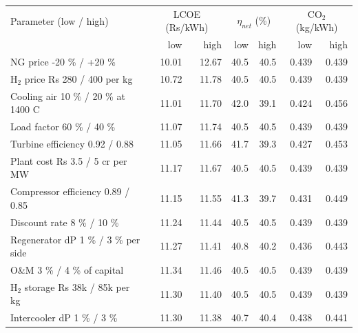\begin{tabular}{lrrrrrr}\toprule Parameter (low / high) & \multicolumn{2}{c}{LCOE (Rs/kWh)} & \multicolumn{2}{c}{$\eta_{net}$ (\%)} & \multicolumn{2}{c}{CO$_2$ (kg/kWh)}\\ & low & high & low & high & low & high\\\midrule
NG price -20 \% / +20 \% & 10.01 & 12.67 & 40.5 & 40.5 & 0.439 & 0.439\\
H$_2$ price Rs 280 / 400 per kg & 10.72 & 11.78 & 40.5 & 40.5 & 0.439 & 0.439\\
Cooling air 10 \% / 20 \% at 1400 C & 11.01 & 11.70 & 42.0 & 39.1 & 0.424 & 0.456\\
Load factor 60 \% / 40 \% & 11.07 & 11.74 & 40.5 & 40.5 & 0.439 & 0.439\\
Turbine efficiency 0.92 / 0.88 & 11.05 & 11.66 & 41.7 & 39.3 & 0.427 & 0.453\\
Plant cost Rs 3.5 / 5 cr per MW & 11.17 & 11.67 & 40.5 & 40.5 & 0.439 & 0.439\\
Compressor efficiency 0.89 / 0.85 & 11.15 & 11.55 & 41.3 & 39.7 & 0.431 & 0.449\\
Discount rate 8 \% / 10 \% & 11.24 & 11.44 & 40.5 & 40.5 & 0.439 & 0.439\\
Regenerator dP 1 \% / 3 \% per side & 11.27 & 11.41 & 40.8 & 40.2 & 0.436 & 0.443\\
O\&M 3 \% / 4 \% of capital & 11.34 & 11.46 & 40.5 & 40.5 & 0.439 & 0.439\\
H$_2$ storage Rs 38k / 85k per kg & 11.30 & 11.40 & 40.5 & 40.5 & 0.439 & 0.439\\
Intercooler dP 1 \% / 3 \% & 11.30 & 11.38 & 40.7 & 40.4 & 0.438 & 0.441\\
\bottomrule\end{tabular}